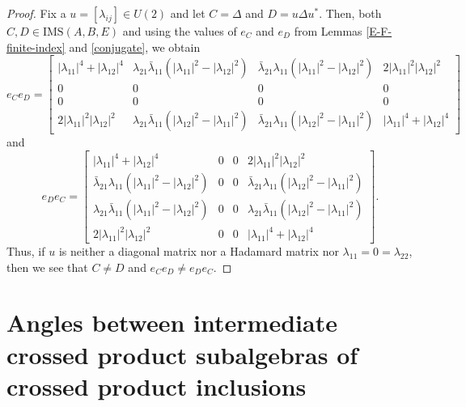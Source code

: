 \documentclass[a4]{amsart}
\numberwithin{equation}{section}
\begin{document}
\begin{proof}
Fix a $u =[\lambda_{ij}]\in U(2)$ and let $C =
\Delta$ and $D = u \Delta u^*$.   Then, both $C , D \in
\mathrm{IMS}(A,B,E)$ and using the values of $e_C $ and $e_D$ from
Lemmas \ref{E-F-finite-index} and \ref{conjugate}, we obtain
\[ e_C e_D= \begin{bmatrix} |\lambda_{11}|^4 + |\lambda_{12}|^4 &
  \lambda_{21} \bar{\lambda}_{11}(|\lambda_{11}|^2 - |\lambda_{12}|^2)
  & \bar{\lambda}_{21} \lambda_{11}(|\lambda_{11}|^2 -
  |\lambda_{12}|^2) & 2|\lambda_{11}|^2 |\lambda_{12}|^2 \\ 0 & 0 & 0
  & 0\\ 0& 0 & 0 & 0\\ 2 |\lambda_{11}|^2 |\lambda_{12}|^2 &
  \lambda_{21} \bar{\lambda}_{11}(|\lambda_{12}|^2 - |\lambda_{11}|^2)
  & \bar{\lambda}_{21} \lambda_{11} (|\lambda_{12}|^2 -
  |\lambda_{11}|^2) & |\lambda_{11}|^4 + |\lambda_{12}|^4
\end{bmatrix}
\]
 and 
 \[
 e_D e_C = \begin{bmatrix} |\lambda_{11}|^4 + |\lambda_{12}|^4 & 0 & 0
   & 2|\lambda_{11}|^2 |\lambda_{12}|^2 \\ \bar{\lambda}_{21}
   \lambda_{11}(|\lambda_{11}|^2-|\lambda_{12}|^2) & 0 & 0 &
   \bar{\lambda}_{21} \lambda_{11}(|\lambda_{12}|^2 -
   |\lambda_{11}|^2)\\ \lambda_{21}
   \bar{\lambda}_{11}(|\lambda_{11}|^2 - |\lambda_{12}|^2) & 0 & 0 &
   \lambda_{21} \bar{\lambda}_{11}(|\lambda_{12}|^2 -
   |\lambda_{11}|^2)\\ 2 |\lambda_{11}|^2 |\lambda_{12}|^2 & 0 & 0 &
   |\lambda_{11}|^4 + |\lambda_{12}|^4
 \end{bmatrix}.
 \]
Thus, if $u$ is neither a diagonal matrix nor a Hadamard matrix nor
$\lambda_{11} = 0 = \lambda_{22}$, then we see that $C \neq D$ and $
e_C e_D \neq e_D e_C$.
\end{proof}



  \section{Angles between intermediate crossed product subalgebras of crossed product inclusions}\label{crossed-products}
\end{document}
